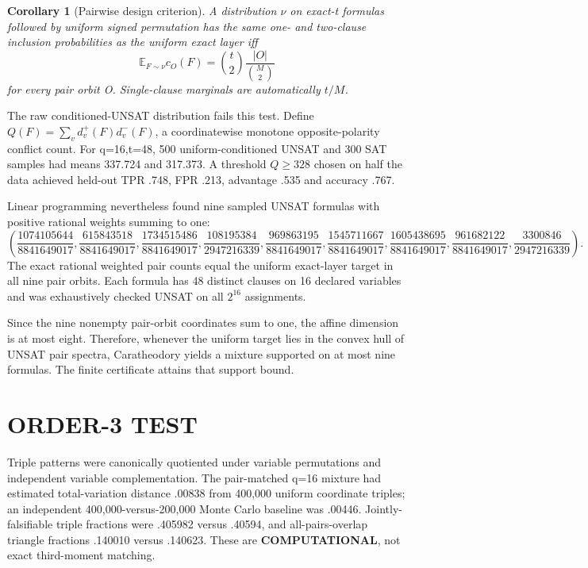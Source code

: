 \documentclass[11pt]{article}
\newtheorem{corollary}[theorem]{Corollary}
\begin{document}
\begin{corollary}[Pairwise design criterion]
A distribution $\nu$ on exact-t formulas followed by uniform signed permutation has the same one- and two-clause inclusion probabilities as the uniform exact layer iff
\[\mathbb E_{F\sim\nu}c_O(F)=\binom t2\frac{|O|}{\binom M2}\]
for every pair orbit O. Single-clause marginals are automatically $t/M$.
\end{corollary}

The raw conditioned-UNSAT distribution fails this test. Define $Q(F)=\sum_v d_v^+(F)d_v^-(F)$, a coordinatewise monotone opposite-polarity conflict count. For q=16,t=48, 500 uniform-conditioned UNSAT and 300 SAT samples had means 337.724 and 317.373. A threshold $Q\ge328$ chosen on half the data achieved held-out TPR .748, FPR .213, advantage .535 and accuracy .767.

Linear programming nevertheless found nine sampled UNSAT formulas with positive rational weights summing to one:
\[\left(
\frac{1074105644}{8841649017},\frac{615843518}{8841649017},\frac{1734515486}{8841649017},
\frac{108195384}{2947216339},\frac{969863195}{8841649017},\frac{1545711667}{8841649017},
\frac{1605438695}{8841649017},\frac{961682122}{8841649017},\frac{3300846}{2947216339}
\right).\]
The exact rational weighted pair counts equal the uniform exact-layer target in all nine pair orbits. Each formula has 48 distinct clauses on 16 declared variables and was exhaustively checked UNSAT on all $2^{16}$ assignments.

Since the nine nonempty pair-orbit coordinates sum to one, the affine dimension is at most eight. Therefore, whenever the uniform target lies in the convex hull of UNSAT pair spectra, Caratheodory yields a mixture supported on at most nine formulas. The finite certificate attains that support bound.

\section{ORDER-3 TEST}
Triple patterns were canonically quotiented under variable permutations and independent variable complementation. The pair-matched q=16 mixture had estimated total-variation distance .00838 from 400,000 uniform coordinate triples; an independent 400,000-versus-200,000 Monte Carlo baseline was .00446. Jointly-falsifiable triple fractions were .405982 versus .40594, and all-pairs-overlap triangle fractions .140010 versus .140623. These are \textbf{COMPUTATIONAL}, not exact third-moment matching.
\end{document}
